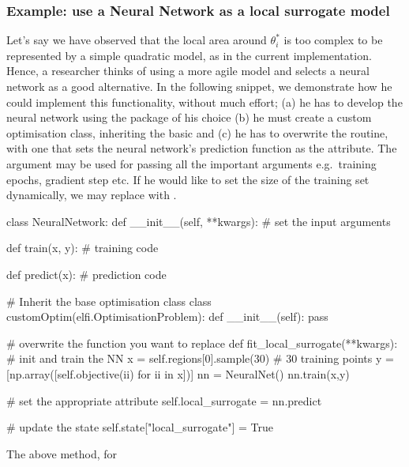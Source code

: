 \subsubsection*{Example: use a Neural Network as a local surrogate model}

Let's say we have observed that the local area around $\theta_i^*$ is
too complex to be represented by a simple quadratic model, as in the
current implementation. Hence, a researcher thinks of using a more
agile model and selects a neural network as a good alternative. In the
following snippet, we demonstrate how he could implement this
functionality, without much effort; (a) he has to develop the neural
network using the package of his choice (b) he must create a custom
optimisation class, inheriting the basic 
and (c) he has to overwrite the  routine,
with one that sets the neural network's prediction function as the
 attribute. The argument 
may be used for passing all the important arguments e.g.\ training
epochs, gradient step etc. If he would like to set the size of the
training set dynamically, we may replace  with .

\begin{pythoncode}
  class NeuralNetwork:
      def __init__(self, **kwargs):
          # set the input arguments

      def train(x, y):
          # training code

      def predict(x):
          # prediction code

  # Inherit the base optimisation class
  class customOptim(elfi.OptimisationProblem):
      def __init__(self):
          pass

      # overwrite the function you want to replace
      def fit_local_surrogate(**kwargs):
          # init and train the NN
          x = self.regions[0].sample(30) # 30 training points
          y = [np.array([self.objective(ii) for ii in x])]
          nn = NeuralNet()
          nn.train(x,y)

          # set the appropriate attribute
          self.local_surrogate = nn.predict

          # update the state
          self.state["local_surrogate"] = True
  
\end{pythoncode}


The above method, for 